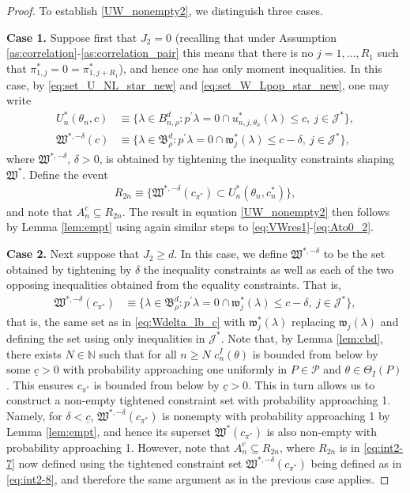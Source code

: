 \documentclass[letterpaper,11pt]{article}
\theoremstyle{myplain}
\theoremstyle{mydefinition}
\theoremstyle{myremark}
\newcommand{\N}{\mathbb{N}}
\newcommand{\cJ}{\mathcal{J}}
\newcommand{\cP}{\mathcal{P}}
\numberwithin{equation}{section}
\numberwithin{figure}{section}
\begin{document}
\begin{appendices}
\begin{proof}
To establish \eqref{UW_nonempty2}, we distinguish three cases.

\noindent \textbf{Case 1.} Suppose first that $J_2 = 0$ (recalling that under Assumption \ref{as:correlation}-\ref{as:correlation_pair} this means that there is no $j=1,\dots,R_1$ such that $\pi_{1,j}^*=0=\pi_{1,j+R_1}^*$), and hence one has only moment inequalities. In this case, by \eqref{eq:set_U_NL_star_new} and \eqref{eq:set_W_Lpop_star_new}, one may write
\begin{align}
	U^*_n(\theta_n,c) &\equiv \big\{\lambda\in B^d_{n,\rho}: p^\prime \lambda = 0 \cap  u^*_{n,j,\theta_n}(\lambda) \le c,~j\in \cJ^*  \big\},\\
	\mathfrak W^{*,-\delta}(c) &\equiv \big\{\lambda\in \mathfrak B^d_\rho: p^\prime \lambda =0 \cap \mathfrak{w}^*_{j}(\lambda)\le c-\delta,~j\in \cJ^*  \big\},
	\label{eq:int2-6}
\end{align}
where $\mathfrak W^{*,-\delta}$, $\delta>0$, is obtained by tightening the inequality constraints shaping $\mathfrak W^{*}$. Define the event 
\begin{align}
	R_{2 n}\equiv\{\mathfrak W^{*,-\delta}(c_{\pi^*})\subset U^*_{n}(\theta_{n},c^{*}_{n})\},\label{eq:int2-7}
\end{align}
and note that $A_{n}^c \subseteq R_{2 n}$. The result in equation \eqref{UW_nonempty2} then follows by Lemma \ref{lem:empt} using again similar steps to \eqref{eq:VWres1}-\eqref{eq:Ato0_2}. 


\noindent \textbf{Case 2.} Next suppose that $J_2\ge d$. In this case,  we define $\mathfrak W^{*,-\delta}$ to be the set obtained by tightening by $\delta$ the inequality constraints as well as each of the two opposing inequalities obtained from the equality constraints.
That is, 
\begin{align}
	\mathfrak W^{*,-\delta}(c_{\pi^*}) &\equiv \{\lambda\in  \mathfrak B^d_\rho: p^\prime \lambda =0 \cap \mathfrak{w}^*_{j}(\lambda)\le c-\delta,~j \in \cJ^*\},\label{eq:int2-8}
\end{align}
that is, the same set as in \eqref{eq:Wdelta_lb_c} with $\mathfrak{w}^*_{j}(\lambda)$ replacing $\mathfrak{w}_{j}(\lambda)$ and defining the set using only inequalities in $\cJ^*$.
Note that, by Lemma \ref{lem:cbd}, there exists $N \in \N$ such that for all $n \ge N$ $c^I_n(\theta)$ is bounded from below by some $\underline{c}>0$ with probability approaching one uniformly in $P \in \cP$ and $\theta \in \Theta_I(P)$. This ensures  $c_{\pi^*}$ is bounded from below by $\underline{c}>0$.
This in turn allows us to construct a non-empty tightened constraint set with probability approaching 1.
Namely, for $\delta<\underline{c}$,  $\mathfrak W^{*,-\delta}(c_{\pi^*})$ is nonempty with probability approaching 1 by Lemma \ref{lem:empt},  and hence its superset $\mathfrak W^{*}(c_{\pi^*})$  is also non-empty with probability approaching 1. However, note that $A_{n}^c \subseteq R_{2 n}$, where $R_{2 n}$ is in \eqref{eq:int2-7} now defined using the tightened constraint set $\mathfrak W^{*,-\delta}(c_{\pi^*}) $ being defined as in \eqref{eq:int2-8}, and therefore the same argument as in the previous case applies.
	

\end{proof}
\end{appendices}
\end{document}
